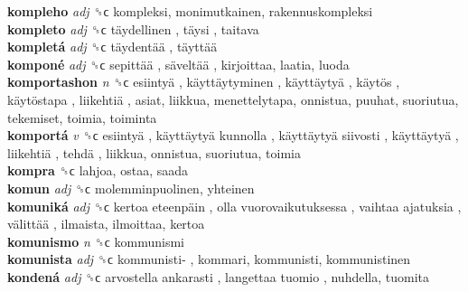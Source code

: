 \textbf{kompleho} \emph{adj}  ␝ϲ  kompleksi, monimutkainen, rakennuskompleksi  \\
\textbf{kompleto} \emph{adj}  ␝ϲ   täydellinen ,  täysi , taitava  \\
\textbf{kompletá} \emph{adj}  ␝ϲ   täydentää ,  täyttää   \\
\textbf{komponé} \emph{adj}  ␝ϲ   sepittää ,  säveltää , kirjoittaa, laatia, luoda  \\
\textbf{komportashon} \emph{n}  ␝ϲ   esiintyä ,  käyttäytyminen ,  käyttäytyä ,  käytös ,  käytöstapa ,  liikehtiä , asiat, liikkua, menettelytapa, onnistua, puuhat, suoriutua, tekemiset, toimia, toiminta  \\
\textbf{komportá} \emph{v}  ␝ϲ   esiintyä ,  käyttäytyä kunnolla ,  käyttäytyä siivosti ,  käyttäytyä ,  liikehtiä ,  tehdä , liikkua, onnistua, suoriutua, toimia  \\
\textbf{kompra} ␝ϲ  lahjoa, ostaa, saada  \\
\textbf{komun} \emph{adj}  ␝ϲ  molemminpuolinen, yhteinen  \\
\textbf{komuniká} \emph{adj}  ␝ϲ   kertoa eteenpäin ,  olla vuorovaikutuksessa ,  vaihtaa ajatuksia ,  välittää , ilmaista, ilmoittaa, kertoa  \\
\textbf{komunismo} \emph{n}  ␝ϲ  kommunismi  \\
\textbf{komunista} \emph{adj}  ␝ϲ   kommunisti- , kommari, kommunisti, kommunistinen  \\
\textbf{kondená} \emph{adj}  ␝ϲ   arvostella ankarasti ,  langettaa tuomio , nuhdella, tuomita  \\
